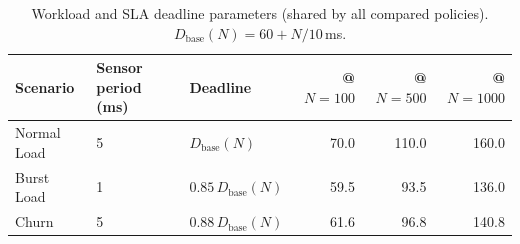 \begin{table}[t]
\centering
\caption{Workload and SLA deadline parameters (shared by all compared policies). $D_{\mathrm{base}}(N)=60+N/10$\,ms.}
\label{tab:workload_spec}
\fgcsTableCol
\begin{tabular*}{\columnwidth}{@{\extracolsep{\fill}}@{}lllrrr@{}@{}}
\toprule
\textbf{Scenario} & \textbf{Sensor period (ms)} & \textbf{Deadline} & \textbf{@ $N=100$} & \textbf{@ $N=500$} & \textbf{@ $N=1000$} \\
\midrule
Normal Load & 5 & $D_{\mathrm{base}}(N)$ & 70.0 & 110.0 & 160.0 \\
Burst Load & 1 & $0.85\,D_{\mathrm{base}}(N)$ & 59.5 & 93.5 & 136.0 \\
Churn & 5 & $0.88\,D_{\mathrm{base}}(N)$ & 61.6 & 96.8 & 140.8 \\
\bottomrule
\end{tabular*}
\end{table}